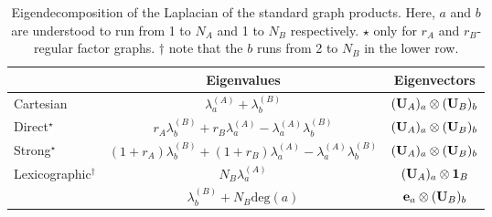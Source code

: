 \begin{table}[t]
    \def\arraystretch{2}
    \centering
    \small
    \vspace{0.5cm}
    \begin{tabular}{l c c}
        \toprule

         & Eigenvalues
         & Eigenvectors                                                                          \\

        \midrule

        Cartesian
         & $\lambda_a^{(A)} + \lambda_b^{(B)}$
         & $(\mathbf{U}_A)_a \otimes (\mathbf{U}_B)_b$                                                           \\

        Direct$^{\star}$
         & $r_A \lambda_b^{(B)} + r_B \lambda_a^{(A)} - \lambda_a^{(A)} \lambda_b^{(B)}$
         & $(\mathbf{U}_A)_a \otimes (\mathbf{U}_B)_b$                                                           \\

        Strong$^{\star}$
         & $(1+r_A) \lambda_b^{(B)} + (1+r_B) \lambda_a ^{(A)}- \lambda_a^{(A)} \lambda_b^{(B)}$
         & $(\mathbf{U}_A)_a \otimes (\mathbf{U}_B)_b$                                                           \\

        \multirow{2}{7em}{Lexicographic$^\dagger$}
         & $N_B \lambda_a^{(A)}$
         & $(\mathbf{U}_A)_a \otimes \mathbf{1}_B$                                                       \\

         & $\lambda_b^{(B)} + N_B \text{deg}(a)$
         & $\mathbf{e}_a \otimes (\mathbf{U}_B)_b$                                                       \\

        \bottomrule
    \end{tabular}
    \vspace{0.2cm}
    \caption[Spectral decomposition of product graphs]{Eigendecomposition of the Laplacian of the standard graph products. Here, $a$ and $b$ are understood to run from 1 to $N_A$ and 1 to $N_B$ respectively. $\star$ only for $r_A$ and $r_B$-regular factor graphs. $\dagger$ note that the $b$ runs from 2 to $N_B$ in the lower row. }
    \vspace{0.3cm}
    \label{tab:product_graph_spectra}
\end{table}



